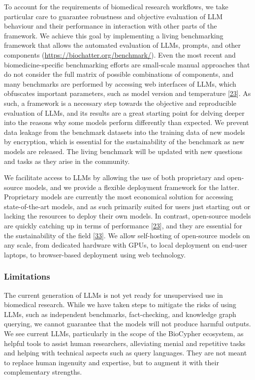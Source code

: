 To account for the requirements of biomedical research workflows, we take particular care to guarantee robustness and objective evaluation of LLM behaviour and their performance in interaction with other parts of the framework.
We achieve this goal by implementing a living benchmarking framework that allows the automated evaluation of LLMs, prompts, and other components (\url{https://biochatter.org/benchmark/}).
Even the most recent and biomedicine-specific benchmarking efforts are small-scale manual approaches that do not consider the full matrix of possible combinations of components, and many benchmarks are performed by accessing web interfaces of LLMs, which obfuscates important parameters, such as model version and temperature {[}\protect\hyperlink{ref-uYvzQA7w}{23}{]}.
As such, a framework is a necessary step towards the objective and reproducible evaluation of LLMs, and its results are a great starting point for delving deeper into the reasons why some models perform differently than expected.
We prevent data leakage from the benchmark datasets into the training data of new models by encryption, which is essential for the sustainability of the benchmark as new models are released.
The living benchmark will be updated with new questions and tasks as they arise in the community.

We facilitate access to LLMs by allowing the use of both proprietary and open-source models, and we provide a flexible deployment framework for the latter.
Proprietary models are currently the most economical solution for accessing state-of-the-art models, and as such primarily suited for users just starting out or lacking the resources to deploy their own models.
In contrast, open-source models are quickly catching up in terms of performance {[}\protect\hyperlink{ref-uYvzQA7w}{23}{]}, and they are essential for the sustainability of the field {[}\protect\hyperlink{ref-BXdkfGlr}{33}{]}.
We allow self-hosting of open-source models on any scale, from dedicated hardware with GPUs, to local deployment on end-user laptops, to browser-based deployment using web technology.

\hypertarget{limitations}{%
\subsubsection{Limitations}\label{limitations}}

The current generation of LLMs is not yet ready for unsupervised use in biomedical research.
While we have taken steps to mitigate the risks of using LLMs, such as independent benchmarks, fact-checking, and knowledge graph querying, we cannot guarantee that the models will not produce harmful outputs.
We see current LLMs, particularly in the scope of the BioCypher ecosystem, as helpful tools to assist human researchers, alleviating menial and repetitive tasks and helping with technical aspects such as query languages.
They are not meant to replace human ingenuity and expertise, but to augment it with their complementary strengths.

